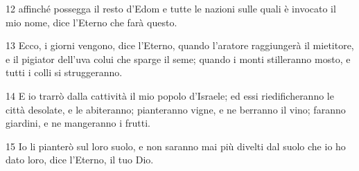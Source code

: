 \par 12 affinché possegga il resto d'Edom e tutte le nazioni sulle quali è invocato il mio nome, dice l'Eterno che farà questo.
\par 13 Ecco, i giorni vengono, dice l'Eterno, quando l'aratore raggiungerà il mietitore, e il pigiator dell'uva colui che sparge il seme; quando i monti stilleranno mosto, e tutti i colli si struggeranno.
\par 14 E io trarrò dalla cattività il mio popolo d'Israele; ed essi riedificheranno le città desolate, e le abiteranno; pianteranno vigne, e ne berranno il vino; faranno giardini, e ne mangeranno i frutti.
\par 15 Io li pianterò sul loro suolo, e non saranno mai più divelti dal suolo che io ho dato loro, dice l'Eterno, il tuo Dio.


